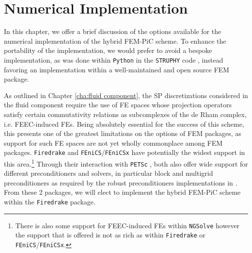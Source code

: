 \chapter{Numerical Implementation}
    In this chapter, we offer a brief discussion of the options available for the numerical implementation of the hybrid FEM-PiC scheme. To enhance the portability of the implementation, we would prefer to avoid a bespoke implementation, as was done within {\tt Python} in the {\tt STRUPHY} code \cite{Holderied_Possanner_Wang_2021, Holderied_2022, Li_et_al_2023}, instead favoring an implementation within a well-maintained and open source FEM package.
    
    As outlined in Chapter \ref{cha:fluid component}, the SP discretizations considered in the fluid component require the use of FE spaces whose projection operators satisfy certain commutativity relations as subcomplexes of the de Rham complex, i.e. FEEC-induced FEs. Being absolutely essential for the success of this scheme, this presents one of the greatest limitations on the options of FEM packages, as support for such FE spaces are not yet wholly commonplace among FEM packages. {\tt Firedrake} \cite{Rathgeber_et_al_2016} and {\tt FEniCS}/{\tt FEniCSx} \cite{Logg_Wells_2010, Logg_Mardal_Wells_2012} have potentially the widest support in this area.\footnote{There is also some support for FEEC-induced FEs within {\tt NGSolve} \cite{Schöberl_2015} however the support that is offered is not as rich as within {\tt Firedrake} or {\tt FEniCS}/{\tt FEniCSx}.} Through their interaction with {\tt PETSc} \cite{Balay_et_al_1997, Balay_et_al_2023}, both also offer wide support for different preconditioners and solvers, in particular block and multigrid preconditioners as required by the robust preconditioners implementations in \cite{Laakmann_Hu_Farrell_2022}. From these 2 packages, we will elect to implement the hybrid FEM-PiC scheme within the {\tt Firedrake} package.

